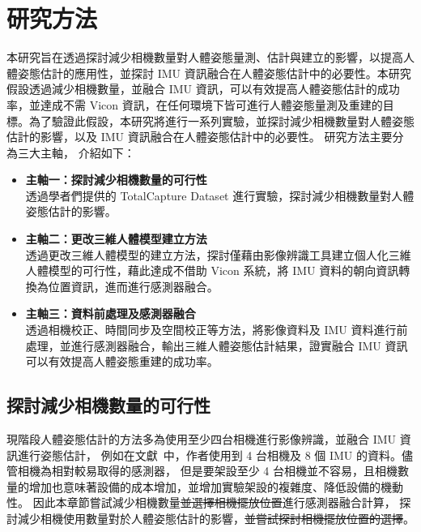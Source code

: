 \chapter{研究方法}
\fontsize{12pt}{18pt}\selectfont

本研究旨在透過探討減少相機數量對人體姿態量測、估計與建立的影響，以提高人體姿態估計的應用性，並探討 IMU 資訊融合在人體姿態估計中的必要性。本研究假設透過減少相機數量，並融合 IMU 資訊，可以有效提高人體姿態估計的成功率，並達成不需 Vicon 資訊，在任何環境下皆可進行人體姿態量測及重建的目標。為了驗證此假設，本研究將進行一系列實驗，並探討減少相機數量對人體姿態估計的影響，以及 IMU 資訊融合在人體姿態估計中的必要性。
研究方法主要分為三大主軸，
介紹如下：
\begin{itemize}
    \item \textbf{主軸一：探討減少相機數量的可行性}
    \\ 透過學者們提供的 TotalCapture Dataset 進行實驗，探討減少相機數量對人體姿態估計的影響。
    \item \textbf{主軸二：更改三維人體模型建立方法}
    \\ 透過更改三維人體模型的建立方法，探討僅藉由影像辨識工具建立個人化三維人體模型的可行性，藉此達成不借助 Vicon 系統，將 IMU 資料的朝向資訊轉換為位置資訊，進而進行感測器融合。
    \item \textbf{主軸三：資料前處理及感測器融合}
    \\ 透過相機校正、時間同步及空間校正等方法，將影像資料及 IMU 資料進行前處理，並進行感測器融合，輸出三維人體姿態估計結果，證實融合 IMU 資訊可以有效提高人體姿態重建的成功率。
\end{itemize}


\clearpage

\section{探討減少相機數量的可行性}
現階段人體姿態估計的方法多為使用至少四台相機進行影像辨識，並融合 IMU 資訊進行姿態估計，
例如在文獻~\cite{Zhang_2020_CVPR}中，作者使用到 4 台相機及 8 個 IMU 的資料。儘管相機為相對較易取得的感測器，
但是要架設至少 4 台相機並不容易，且相機數量的增加也意味著設備的成本增加，並增加實驗架設的複雜度、降低設備的機動性。
因此本章節嘗試減少相機數量\sout{並選擇相機擺放位置}進行感測器融合計算，
探討減少相機使用數量對於人體姿態估計的影響，\sout{並嘗試探討相機擺放位置的選擇}。

